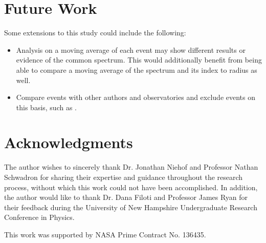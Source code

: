 \documentclass[letterpaper,11pt]{article}
\begin{document}
\section{Future Work}
\label{sec:future}
Some extensions to this study could include the following:

\begin{itemize}
\item Analysis on a moving average of each event may show different results or evidence of the common spectrum.  This would additionally benefit from being able to compare a moving average of the spectrum and its index to radius as well.
\item Compare events with other authors and observatories and exclude events on this basis, such as \citet{Cohen2020}.
\end{itemize}



\section{Acknowledgments}
The author wishes to sincerely thank Dr. Jonathan Niehof and Professor Nathan Schwadron for sharing their expertise and guidance throughout the research process, without which this work could not have been accomplished. In addition, the author would like to thank Dr. Dana Filoti and Professor James Ryan for their feedback during the University of New Hampshire Undergraduate Research Conference in Physics.

\bigskip

\noindent This work was supported by NASA Prime Contract No. 136435.




%
%

\end{document}
